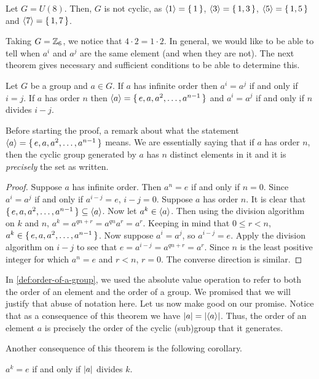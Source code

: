 \documentclass[./main.tex]{subfiles}
\begin{document}
\begin{example}
    Let $G = U(8)$. Then, $G$ is not cyclic, as ${ \langle 1 \rangle } = \set{1}$, ${ \langle 3 \rangle } =
    \set{1, 3}$, ${ \langle 5 \rangle } = \set{1,5}$ and ${ \langle 7 \rangle } = \set{1,7}$.
\end{example}

Taking $G = \mathbb{Z}_6$, we notice that $4 \cdot 2 = 1 \cdot 2$. In general, we would
like to be able to tell when $a^i$ and $a^j$ are the same element (and when they
are not). The next theorem gives necessary and sufficient conditions to be able
to determine this.

\begin{theorem}
    Let $G$ be a group and $a \in G$. If $a$ has infinite order then $a^i = a^j$
    if and only if $i=j$. If $a$ has order $n$ then ${ \langle a \rangle } = \set{e, a, a^2,
    \dots, a^{n-1}}$ and $a^i = a^j$ if and only if $n$ divides $i-j$.
\end{theorem}
Before starting the proof, a remark about what the statement ${ \langle a \rangle } = \set{e,
a, a^2, \dots, a^{n-1}}$ means. We are essentially saying that if $a$ has order
$n$, then the cyclic group generated by $a$ has $n$ distinct elements in it and
it is \emph{precisely} the set as written.
\begin{proof}
    Suppose $a$ has infinite order. Then $a^n = e$ if and only if $n=0$. Since
    $a^i = a^j$ if and only if $a^{i-j} = e$, $i-j=0$. Suppose $a$ has order
    $n$. It is clear that $\set{e, a, a^2, \dots, a^{n-1}} \subseteq { \langle a \rangle }$.
    Now let $a^k \in { \langle a \rangle }$. Then using the division algorithm on $k$ and $n$,
    $a^k = a^{qn + r} = a^{qn} a^r = a^r$. Keeping in mind that $0 \leq r < n$,
    $a^k \in \set{e, a, a^2, \dots, a^{n-1}}$. Now suppose $a^i = a^j$, so
    $a^{i-j} = e$. Apply the division algorithm on $i-j$ to see that $e =
    a^{i-j} = a^{qn + r} = a^r$. Since $n$ is the least positive integer for
    which $a^n = e$ and $r < n$, $r=0$. The converse direction is similar.
\end{proof}

In \cref{def:order-of-a-group}, we used the absolute value operation to refer to
both the order of an element and the order of a group. We promised that we will
justify that abuse of notation here. Let us now make good on our promise. Notice
that as a consequence of this theorem we have $\abs{a} = \abs{\gen{a}}$. Thus,
the order of an element $a$ is precisely the order of the cyclic (sub)group that
it generates. 

Another consequence of this theorem is the following corollary.
\begin{corollary}
\label{cor:element-power-being-identity}
    $a^k = e$ if and only if $\abs{a}$ divides $k$. 
\end{corollary}
\end{document}
